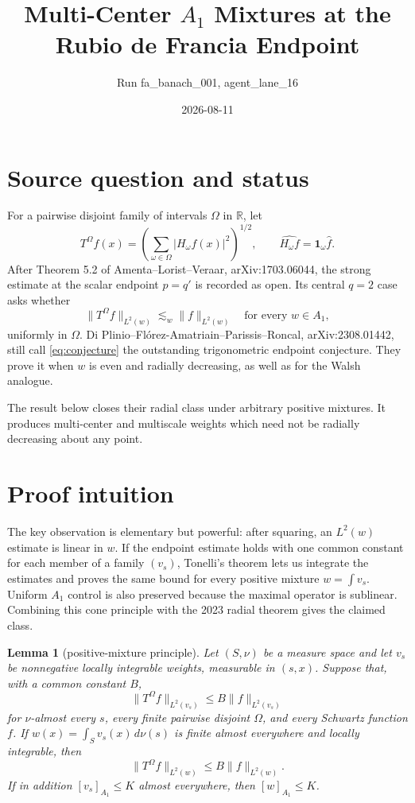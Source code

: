 \documentclass[11pt]{article}
\title{Multi-Center \(A_1\) Mixtures at the Rubio de Francia Endpoint}
\author{Run fa\_banach\_001, agent\_lane\_16}
\date{2026-08-11}
\newtheorem{lemma}{Lemma}
\newcommand{\R}{\mathbb R}
\newcommand{\one}{\mathbf 1}
\newcommand{\Om}{\Omega}
\begin{document}
\maketitle

\section*{Source question and status}

For a pairwise disjoint family of intervals \(\Om\) in \(\R\), let
\[
 T^{\Om}f(x)=\left(\sum_{\omega\in\Om}|H_\omega f(x)|^2\right)^{1/2},
 \qquad
 \widehat{H_\omega f}=\one_\omega\widehat f.
\]
After Theorem 5.2 of Amenta--Lorist--Veraar, arXiv:1703.06044, the
strong estimate at the scalar endpoint \(p=q'\) is recorded as open.  Its
central \(q=2\) case asks whether
\begin{equation}\label{eq:conjecture}
 \|T^{\Om}f\|_{L^2(w)}\lesssim_w\|f\|_{L^2(w)}
 \quad\text{for every }w\in A_1,
\end{equation}
uniformly in \(\Om\).  Di Plinio--Fl\'orez-Amatriain--Parissis--Roncal,
arXiv:2308.01442, still call \eqref{eq:conjecture} the outstanding
trigonometric endpoint conjecture.  They prove it when \(w\) is even and
radially decreasing, as well as for the Walsh analogue.

The result below closes their radial class under arbitrary positive mixtures.
It produces multi-center and multiscale weights which need not be radially
decreasing about any point.

\section*{Proof intuition}

The key observation is elementary but powerful: after squaring, an
\(L^2(w)\) estimate is linear in \(w\).  If the endpoint estimate holds with
one common constant for each member of a family \((v_s)\), Tonelli's theorem
lets us integrate the estimates and proves the same bound for every positive
mixture \(w=\int v_s\).  Uniform \(A_1\) control is also preserved because
the maximal operator is sublinear.  Combining this cone principle with the
2023 radial theorem gives the claimed class.

\begin{lemma}[positive-mixture principle]\label{lem:mixture}
Let \((S,\nu)\) be a measure space and let \(v_s\) be nonnegative locally
integrable weights, measurable in \((s,x)\).  Suppose that, with a common
constant \(B\),
\[
 \|T^{\Om}f\|_{L^2(v_s)}\le B\|f\|_{L^2(v_s)}
\]
for \(\nu\)-almost every \(s\), every finite pairwise disjoint \(\Om\), and
every Schwartz function \(f\).  If
\(w(x)=\int_Sv_s(x)\,d\nu(s)\) is finite almost everywhere and locally
integrable, then
\[
 \|T^{\Om}f\|_{L^2(w)}\le B\|f\|_{L^2(w)}.
\]
If in addition \([v_s]_{A_1}\le K\) almost everywhere, then
\([w]_{A_1}\le K\).
\end{lemma}
\end{document}
